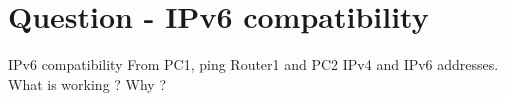 \section{Question - IPv6 compatibility}

\begin{questionBox}{IPv6 compatibility}
    From PC1, ping Router1 and PC2 IPv4 and IPv6 addresses. What is working ? Why ?    
\end{questionBox}
